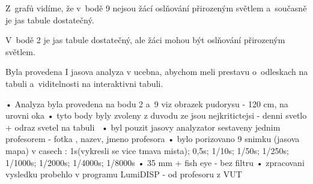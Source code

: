 Z~grafů vidíme, že v~bodě 9 nejsou žácí oslňování přirozeným světlem a~současně je jas tabule dostatečný.

V~bodě 2 je jas tabule dostatečný, ale žáci mohou být oslňování přirozeným světlem.

Byla provedena I jasova analyza v ucebna, abychom meli prestavu o~odleskach na tabuli a~viditelnosti na interaktivni tabuli.

    • Analyza byla provedena na bodu 2 a~9 viz obrazek pudorysu - 120 cm, na urovni oka
    \medskip
    • tyto body byly zvoleny z duvodu ze jsou nejkritictejsi - denni svetlo + odraz svetel na tabuli\
    \medskip
    • byl pouzit jasovy analyzator sestaveny jednim profesorem - fotka , nazev, jmeno profesora
    \medskip
    • bylo porizovano 9 snimku (jasova mapa) v casech : 1s(vykresli se vice tmava mista); 0,5s; 1/10s; 1/50s; 1/250s; 1/1000s; 1/2000s; 1/4000s; 1/8000s
    \medskip
    • 35 mm + fish eye - bez filtru
    \medskip
    • zpracovani vysledku probehlo v programu LumiDISP - od profesoru z VUT




















